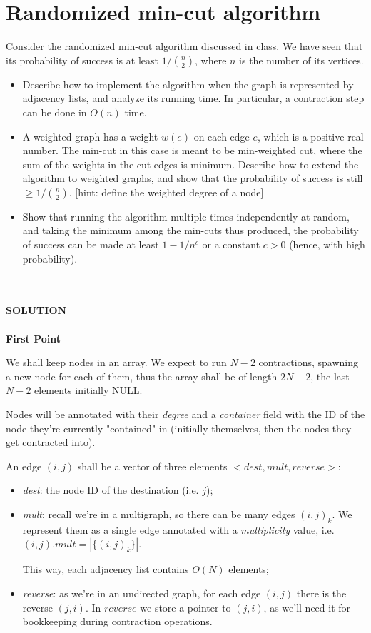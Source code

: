 \documentclass[a4paper]{article}
\begin{document}
\section*{Randomized min-cut algorithm}
Consider the randomized min-cut algorithm discussed in class.
We have seen that its probability of success is at least $1 / \binom{n}{2}$, where $n$ is the number of its vertices.
\begin{itemize}
\item Describe how to implement the algorithm when the graph is represented by adjacency lists, and analyze its running time.
In particular, a contraction step can be done in $O(n)$ time.
\item A weighted graph has a weight $w(e)$ on each edge $e$, which  is  a  positive  real number.
The  min-cut  in  this  case  is  meant  to  be  min-weighted  cut,  where  the sum  of  the  weights  in  the  cut  edges  is  minimum.
Describe  how  to  extend  the algorithm  to  weighted  graphs,  and  show  that  the  probability  of  success  is  still $\geq 1/\binom{n}{2}$. [hint: define the weighted degree of a node]
\item Show that running the algorithm multiple times independently at random, and taking the minimum among the min-cuts thus produced, the probability of success can be made at least $1 - 1/n^c$ or a constant $c > 0$ (hence, with high probability).
\end{itemize}
\
\\
\\
\textbf{SOLUTION}
\\
\\

\noindent
\textbf{First Point}

We shall keep nodes in an array. We expect to run $N-2$ contractions, spawning a new node for each of them, thus the array shall be of length $2N-2$, the last $N-2$ elements initially NULL.

Nodes will be annotated with their \emph{degree} and a \emph{container} field with the ID of the node they're currently "contained" in (initially themselves, then the nodes they get contracted into).

An edge $(i,j)$ shall be a vector of three elements $<dest, mult, reverse>$:
\begin{itemize}
\item \emph{dest}: the node ID of the destination (i.e. $j$);
\item \emph{mult}: recall we're in a multigraph, so there can be many edges $(i,j)_k$. We represent them as a single edge annotated with a \emph{multiplicity} value, i.e. $(i,j).mult = |\{(i,j)_k\}|$.

This way, each adjacency list contains $O(N)$ elements;
\item \emph{reverse}: as we're in an undirected graph, for each edge $(i,j)$ there is the reverse $(j,i)$. In $reverse$ we store a pointer to $(j,i)$, as we'll need it for bookkeeping during contraction operations.
\end{itemize}
\end{document}
